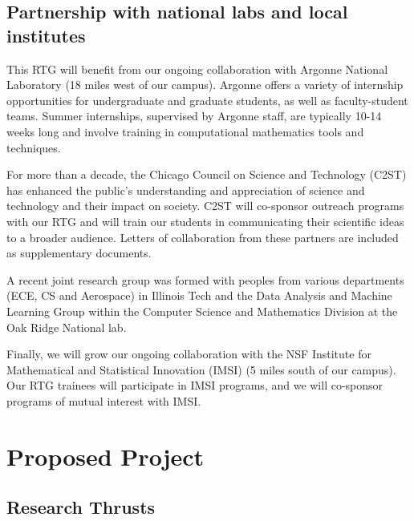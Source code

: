 \documentclass[11pt]{NSFamsart}
\begin{document}
\subsection*{Partnership with  national labs and local institutes} 
This RTG will benefit from our ongoing collaboration with Argonne National Laboratory (18 miles west of our campus).  Argonne offers a variety of internship opportunities for undergraduate and graduate students, as well as faculty-student teams. Summer internships, supervised by Argonne staff, are typically 10-14 weeks long and involve training in computational mathematics tools and techniques. %

For more than a decade, the Chicago Council on Science and Technology (C2ST) has enhanced the public’s understanding and appreciation of science and technology and their impact on society. C2ST will co-sponsor outreach programs with our RTG and will train our students in communicating their scientific ideas to a broader audience. Letters of collaboration from these partners are included as supplementary documents.  

A recent joint research group was formed with peoples from various departments (ECE, CS and Aerospace) in Illinois Tech and the Data Analysis and Machine Learning Group within the Computer Science and Mathematics Division at the Oak Ridge National lab. 

Finally, we will grow our ongoing collaboration with the NSF Institute for Mathematical and Statistical Innovation (IMSI) %
(5 miles south of our campus). %
Our RTG trainees will participate in IMSI programs, and we will co-sponsor programs of mutual interest with IMSI. 







\section{Proposed Project } 
 

\subsection{Research Thrusts} \label{sec:researchproblems}
\end{document}

